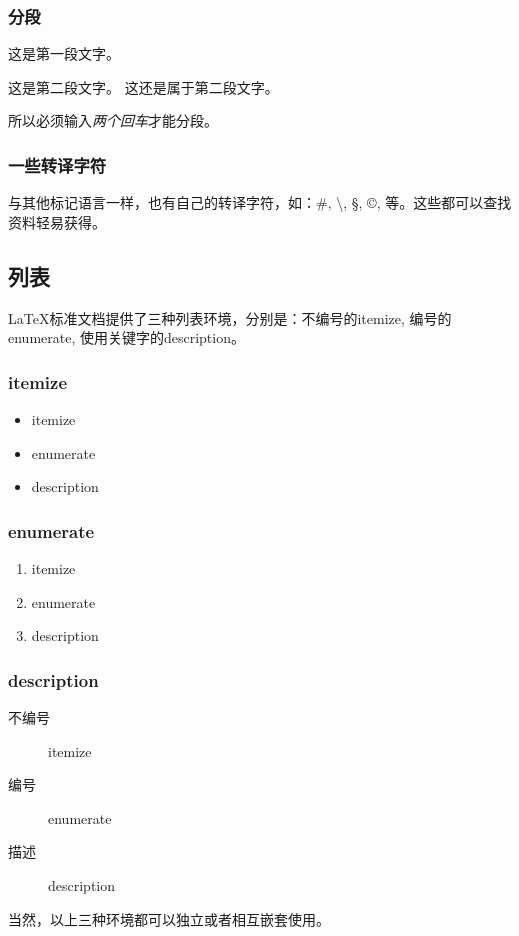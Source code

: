 \documentclass{ctexart} %
\begin{document}
            \subsubsection{分段}
                这是第一段文字。

                这是第二段文字。
                这还是属于第二段文字。

                所以必须输入\emph{两个回车}才能分段。 
            \subsubsection{一些转译字符}
            与其他标记语言一样，也有自己的转译字符，如：\#, \textbackslash, \S, \copyright, \textregistered 等。这些都可以查找资料轻易获得。
        \subsection{列表}
            \LaTeX 标准文档提供了三种列表环境，分别是：不编号的itemize, 编号的enumerate, 使用关键字的description。
            \subsubsection{itemize}
                \begin{itemize}
                    \item itemize
                    \item enumerate
                    \item description
                \end{itemize}
            \subsubsection{enumerate}
                \begin{enumerate}
                    \item itemize
                    \item enumerate
                    \item description
                \end{enumerate}
            \subsubsection{description}
                \begin{description}
                    \item[不编号] itemize
                    \item[编号] enumerate
                    \item[描述] description  
                \end{description}
                当然，以上三种环境都可以独立或者相互嵌套使用。
\end{document}
